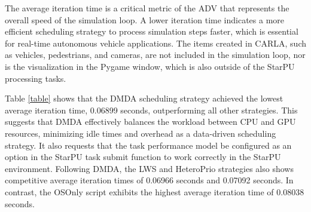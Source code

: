 \documentclass[conference]{IEEEtran}
\begin{document}


The average iteration time is a critical metric of the ADV that represents the overall speed of the simulation loop. A lower iteration time indicates a more efficient scheduling strategy to process simulation steps faster, which is essential for real-time autonomous vehicle applications. The items created in CARLA, such as vehicles, pedestrians, and cameras, are not included in the simulation loop, nor is the visualization in the Pygame window, which is also outside of the StarPU processing tasks. 


Table \ref{table} shows that the DMDA scheduling strategy achieved the lowest average iteration time, 0.06899 seconds, outperforming all other strategies. This suggests that DMDA effectively balances the workload between CPU and GPU resources, minimizing idle times and overhead as a data-driven scheduling strategy. It also requests that the task performance model be configured as an option in the StarPU task submit function to work correctly in the StarPU environment. Following DMDA, the LWS and HeteroPrio strategies also shows competitive average iteration times of 0.06966 seconds and 0.07092 seconds. In contrast, the OSOnly script exhibits the highest average iteration time of 0.08038 seconds. %
\end{document}
